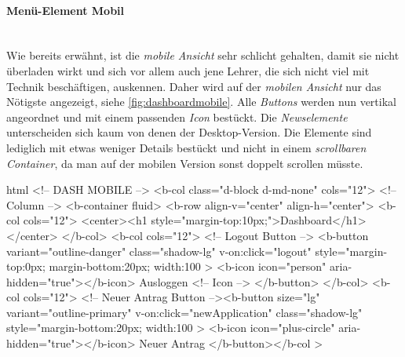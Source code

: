 \paragraph{Menü-Element Mobil}
~\\
Wie bereits erwähnt, ist die \textit{mobile Ansicht} sehr schlicht gehalten, damit sie nicht überladen wirkt und sich vor allem auch jene Lehrer, die sich nicht viel mit Technik beschäftigen, auskennen. Daher wird auf der \textit{mobilen Ansicht} nur das Nötigste angezeigt, siehe \autoref{fig:dashboardmobile}. Alle \textit{Buttons} werden nun vertikal angeordnet und mit einem passenden \textit{Icon} bestückt. Die \textit{Newselemente} unterscheiden sich kaum von denen der Desktop-Version. Die Elemente sind lediglich mit etwas weniger Details bestückt und nicht in einem \textit{scrollbaren Container}, da man auf der mobilen Version sonst doppelt scrollen müsste.
\begin{code}{html}
	<!-- DASH MOBILE -->
	<b-col class="d-block d-md-none" cols="12">
	  <!-- Column -->
	  <b-container fluid>
		<b-row align-v="center" align-h="center">
		  <b-col cols="12">
			<center><h1 style="margin-top:10px;">Dashboard</h1></center>
		  </b-col>
		  <b-col cols="12">
			<!-- Logout Button -->
			<b-button
			  variant="outline-danger"
			  class="shadow-lg"
			  v-on:click="logout"
			  style="margin-top:0px; margin-bottom:20px; width:100%
			>
			  <b-icon icon="person" aria-hidden="true"></b-icon> Ausloggen
			  <!-- Icon -->
			</b-button>
		  </b-col>
		  <b-col cols="12">
			<!-- Neuer Antrag Button --><b-button
			  size="lg"
			  variant="outline-primary"
			  v-on:click="newApplication"
			  class="shadow-lg"
			  style="margin-bottom:20px; width:100%
			>
			  <b-icon icon="plus-circle" aria-hidden="true"></b-icon> Neuer
			  Antrag
			</b-button></b-col
		  >	
\end{code}
	\label{list:startmobile}
	\newpage
